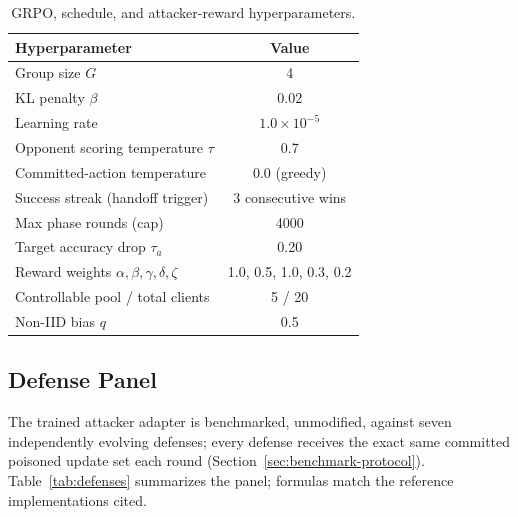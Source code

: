 \documentclass[conference]{IEEEtran}
\begin{document}
\begin{table}[t]
\caption{GRPO, schedule, and attacker-reward hyperparameters.}
\label{tab:hparams}
\centering
\small
\begin{tabular}{@{}lc@{}}
\toprule
\textbf{Hyperparameter} & \textbf{Value} \\
\midrule
Group size $G$ & 4 \\
KL penalty $\beta$ & 0.02 \\
Learning rate & $1.0\times10^{-5}$ \\
Opponent scoring temperature $\tau$ & 0.7 \\
Committed-action temperature & 0.0 (greedy) \\
Success streak (handoff trigger) & 3 consecutive wins \\
Max phase rounds (cap) & 4000 \\
Target accuracy drop $\tau_a$ & 0.20 \\
Reward weights $\alpha,\beta,\gamma,\delta,\zeta$ & 1.0, 0.5, 1.0, 0.3, 0.2 \\
Controllable pool / total clients & 5 / 20 \\
Non-IID bias $q$ & 0.5 \\
\bottomrule
\end{tabular}
\end{table}

\subsection{Defense Panel}
\label{sec:defense-panel}
The trained attacker adapter is benchmarked, unmodified, against seven independently evolving defenses; every defense receives the exact same committed poisoned update set each round (Section~\ref{sec:benchmark-protocol}). Table~\ref{tab:defenses} summarizes the panel; formulas match the reference implementations cited.
\end{document}
